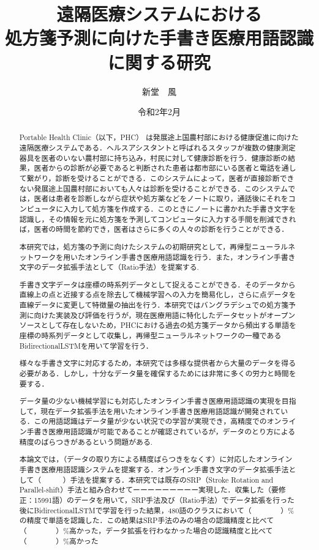 \documentclass[a4paper,12pt]{jreport}
\title{遠隔医療システムにおける\\処方箋予測に向けた手書き医療用語認識に関する研究}
\author{新堂　風}
\date{令和2年2月}
\begin{document}
\maketitle
\thispagestyle{empty}

\begin{abstract}
 Portable Health Clinic（以下，PHC） は発展途上国農村部における健康促進に向けた遠隔医療システムである．ヘルスアシスタントと呼ばれるスタッフが複数の健康測定器具を医者のいない農村部に持ち込み，村民に対して健康診断を行う．健康診断の結果，医者からの診断が必要であると判断された患者は都市部にいる医者と電話を通して繋がり，診断を受けることができる．このシステムによって，医者が直接診断できない発展途上国農村部においても人々は診断を受けることができる．このシステムでは，医者は患者を診断しながら症状や処方薬などをノートに取り，通話後にそれをコンピュータに入力して処方箋を作成する．このときにノートに書かれた手書き文字を認識し，その情報を元に処方箋を予測してコンピュータに入力する手間を削減できれば，医者の時間を節約でき，医者はさらに多くの人々の診断を行うことができる．

本研究では，処方箋の予測に向けたシステムの初期研究として，再帰型ニューラルネットワークを用いたオンライン手書き医療用語認識を行う．また，オンライン手書き文字のデータ拡張手法として（Ratio手法）を提案する.


手書き文字データは座標の時系列データとして捉えることができる．そのデータから直線上の点と近接する点を除去して機械学習への入力を簡易化し，さらに点データを直線データに変更して特徴量の抽出を行う．本研究ではバングラデシュでの処方箋予測に向けた実装及び評価を行うが，現在医療用語に特化したデータセットがオープンソースとして存在しないため，PHCにおける過去の処方箋データから頻出する単語を座標の時系列データとして収集し，再帰型ニューラルネットワークの一種であるBidirectionalLSTMを用いて学習を行う．

様々な手書き文字に対応するため，本研究では多様な提供者から大量のデータを得る必要がある．しかし，十分なデータ量を確保するためには非常に多くの労力と時間を要する．

データ量の少ない機械学習にも対応したオンライン手書き医療用語認識の実現を目指して，現在データ拡張手法を用いたオンライン手書き医療用語認識が開発されている．この用語認識はデータ量が少ない状況での学習が実現でき，高精度でのオンライン手書き医療用語認識が可能であることが確認されているが，データのとり方による精度のばらつきがあるという問題がある.

本論文では，（データの取り方による精度ばらつきをなくす）に対応したオンライン手書き医療用語認識システムを提案する．オンライン手書き文字のデータ拡張手法として（　　　）手法を提案する．本研究では既存のSRP（Stroke Rotation and Parallel-shift）手法と組み合わせてーーーーーーーーー実現した．収集した（要修正：15991語）のデータを用いて，SRP手法及び（Ratio手法）でデータ拡張を行った後にBidirectionalLSTMで学習を行った結果，480語のクラスにおいて（　　　　）\%の精度で単語を認識した．この結果はSRP手法のみの場合の認識精度と比べて（　　　　）\%高かった，データ拡張を行わなかった場合の認識精度と比べて（　　　　）\%高かった

\end{abstract}
\end{document}
